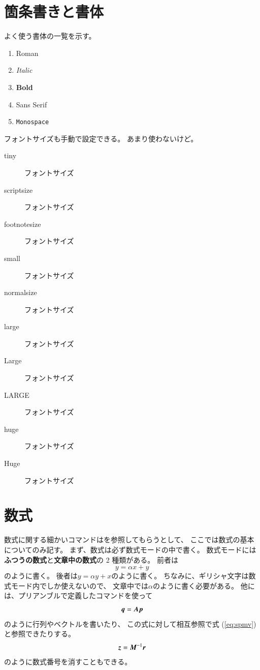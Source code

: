 \documentclass[14pt,a4j]{jsarticle}
\newcommand{\bvec}[1]{\mbox{\boldmath $#1$}} %
\begin{document}
\section{箇条書きと書体}
よく使う書体の一覧を示す。
\begin{enumerate}
 \item \textrm{Roman}
 \item \textit{Italic}
 \item \textbf{Bold}
 \item \textsf{Sans Serif}
 \item \texttt{Monospace}
\end{enumerate}
フォントサイズも手動で設定できる。
あまり使わないけど。
\begin{description}
 \item[tiny] {\tiny フォントサイズ}
 \item[scriptsize] {\scriptsize フォントサイズ}
 \item[footnotesize] {\footnotesize フォントサイズ}
 \item[small] {\small フォントサイズ}
 \item[normalsize] {\normalsize フォントサイズ}
 \item[large] {\large フォントサイズ}
 \item[Large] {\Large フォントサイズ}
 \item[LARGE] {\LARGE フォントサイズ}
 \item[huge] {\huge フォントサイズ}
 \item[Huge] {\Huge フォントサイズ}
\end{description}
%
\section{数式}
数式に関する細かいコマンドは\cite{list_commands}を参照してもらうとして、
ここでは数式の基本についてのみ記す。
まず、数式は必ず数式モードの中で書く。
数式モードには\textbf{ふつうの数式}と\textbf{文章中の数式}の 2 種類がある。
前者は
\begin{equation}
 y = \alpha x + y
\end{equation}
のように書く。
後者は$y = \alpha y + x$のように書く。
ちなみに、ギリシャ文字は数式モード内でしか使えないので、
文章中では$\alpha$のように書く必要がある。
他には、プリアンブルで定義したコマンドを使って
\begin{equation}
 \bvec{q} = \bvec{A} \bvec{p}\label{eq:spmv}
\end{equation}
のように行列やベクトルを書いたり、
この式に対して相互参照で式 (\ref{eq:spmv}) と参照できたりする。
\begin{equation}
 \bvec{z} = \bvec{M}^{-1} \bvec{r}\nonumber
\end{equation}
のように数式番号を消すこともできる。
%
\end{document}
